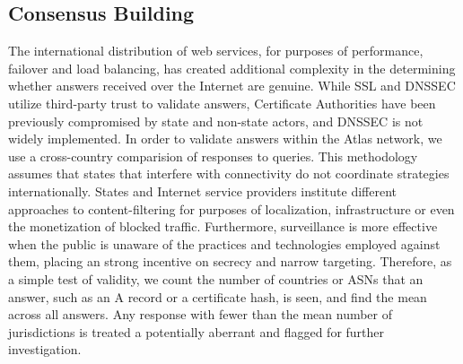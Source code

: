 \subsection{Consensus Building}

The international distribution of web services, for purposes of performance, failover and load balancing, has created additional complexity in the determining whether answers received over the Internet are genuine. While SSL and DNSSEC utilize third-party trust to validate answers, Certificate Authorities have been previously compromised by state and non-state actors, and DNSSEC is not widely implemented. In order to validate answers within the Atlas network, we use a cross-country comparision of responses to queries. This methodology assumes that states that interfere with connectivity do not coordinate strategies internationally. States and Internet service providers institute different approaches to content-filtering for purposes of localization, infrastructure or even the monetization of blocked traffic. Furthermore, surveillance is more effective when the public is unaware of the practices and technologies employed against them, placing an strong incentive on secrecy and narrow targeting. Therefore, as a simple test of validity, we count the number of countries or ASNs that an answer, such as an A record or a certificate hash, is seen, and find the mean across all answers. Any response with fewer than the mean number of jurisdictions is treated a potentially aberrant and flagged for further investigation.
